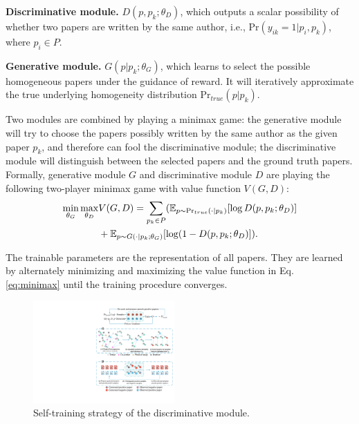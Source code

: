 \documentclass[letterpaper]{article} %
\begin{document}
\vspace*{1pt}
\textbf{Discriminative module.} $D(p, p_k; \theta_D)$, which outputs a scalar possibility of whether two papers are written by the same author, i.e., $\text{Pr}(y_{ik}=1|p_i,p_k)$, where $p_i \in P$.

\vspace*{2pt}
\textbf{Generative module.} $G(p|p_k; \theta_G)$, which learns to select the possible homogeneous papers under the guidance of reward. It will iteratively approximate the true underlying homogeneity distribution $\text{Pr}_{true}(p|p_k)$.

Two modules are combined by playing a minimax game:
the generative module will try to choose the papers possibly written by the same author as the given paper $p_k$, and therefore can fool the discriminative module;
the discriminative module will distinguish between the selected papers and the ground truth papers.
Formally, generative module $G$ and discriminative module $D$ are playing the following two-player minimax game with value function $V(G, D)$:
\begin{equation}
\begin{split}
\small
\min_{\theta_G}  \max_{\theta_D} & V(G, D) = \sum_{p_k \in P} (\mathbb{E}_{p \sim \text{Pr}_{true}(\cdot|p_k)}[\log D(p, p_k; \theta_D)] \\
&+ \mathbb{E}_{p \sim G(\cdot|p_k;\theta_G)} [\log(1-D(p, p_k; \theta_D)]).
\label{eq:minimax}
\end{split}
\end{equation}

The trainable parameters are the representation of all papers. They are learned by alternately minimizing and maximizing the value function in Eq.~ \eqref{eq:minimax} until the training procedure converges.
\begin{figure}[t]
\centering
\includegraphics[width=0.48\textwidth]{D.pdf}
\caption{Self-training strategy of the discriminative module.}
\label{fig:D_framework}
\end{figure}
\end{document}
